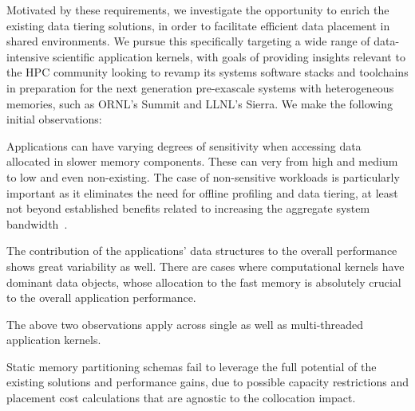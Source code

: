 Motivated by these requirements, we investigate the opportunity to enrich the existing data tiering solutions, in order to facilitate efficient data placement in shared environments. 
We pursue this specifically targeting a wide range of data-intensive scientific application kernels, with goals of providing insights relevant to the HPC community looking to revamp its systems software stacks and toolchains in preparation for the next generation pre-exascale systems with heterogeneous memories, such as ORNL's Summit and LLNL's Sierra. 
We make the following initial observations:

\begin{tightenumerate}
\item Applications can have varying degrees of sensitivity when accessing data allocated in slower memory components. These can very from high and medium to low and even non-existing. 
The case of non-sensitive workloads is particularly important as it eliminates the need for offline profiling and data tiering, 
at least not beyond established benefits related to increasing the aggregate system bandwidth~\cite{Chou:Batman}.  
\item The contribution of the applications' data structures to the overall performance shows great variability as well. There are cases where computational kernels have dominant 
data objects, whose allocation to the fast memory is absolutely crucial to the overall application performance. 
\item The above two observations apply across single as well as multi-threaded application kernels.
\item Static memory partitioning schemas fail to leverage the full potential of the existing solutions and performance gains, due to possible capacity restrictions and placement cost calculations that are 
agnostic to the collocation impact. 
\end{tightenumerate}


